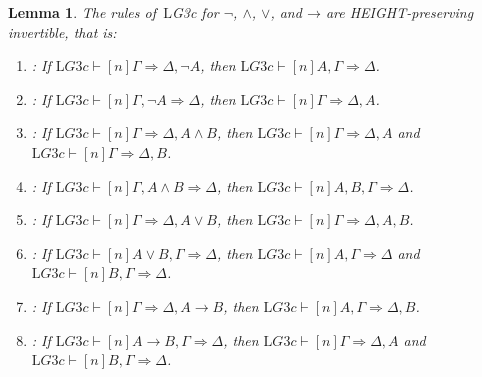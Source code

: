 \documentclass[10pt,a4paper]{article}
\newcommand*{\olup}[1]{\MakeUppercase{#1}}
\theoremstyle{plain}
\newtheorem{lem}[thm]{Lemma}
\theoremstyle{definition}
\theoremstyle{remark}
\newcommand*{\ollabel}[1]{\label{#1}}
\providecommand{\lif}{\mathbin{\rightarrow}}
\providecommand{\Sequent}{\mathrel{\Rightarrow}}
\providecommand{\Proves}{\mathrel{\vdash}}
\providecommand{\Log}{\ensuremath{\mathrm{L}}}
\providecommand{\LeftR}[1]{}
\providecommand{\RightR}[1]{}
\providecommand{\RightR}{\mathrm{R}}
\providecommand{\LeftR}{\mathrm{L}}
\begin{document}
\begin{lem}\ollabel{lem:G3c-invert}
The rules of~\Log{G3c} for $\lnot$, $\land$, $\lor$, and $\lif$ are
\olup{height}-preserving invertible, that is:
\begin{enumerate}
  \item \RightR{\lnot}: If $\Log{G3c} \Proves[n] \Gamma \Sequent
  \Delta, \lnot A$, then $\Log{G3c} \Proves[n] A, \Gamma \Sequent
  \Delta$.
  \item \LeftR{\lnot}: If $\Log{G3c} \Proves[n] \Gamma, \lnot A
  \Sequent \Delta$, then $\Log{G3c} \Proves[n] \Gamma \Sequent \Delta,
  A$.
  \item \RightR{\land}: If $\Log{G3c} \Proves[n] \Gamma \Sequent
  \Delta, A \land B$, then $\Log{G3c} \Proves[n] \Gamma \Sequent
  \Delta, A$ and $\Log{G3c} \Proves[n] \Gamma \Sequent
  \Delta, B$.
  \item \LeftR{\land}: If $\Log{G3c} \Proves[n] \Gamma, A \land B
  \Sequent \Delta$, then $\Log{G3c} \Proves[n] A, B, \Gamma \Sequent
  \Delta$.
  \item \RightR{\lor}: If $\Log{G3c} \Proves[n] \Gamma \Sequent
  \Delta, A \lor B$, then $\Log{G3c} \Proves[n] \Gamma \Sequent
  \Delta, A, B$.
  \item \LeftR{\lor}: If $\Log{G3c} \Proves[n] A \lor B, \Gamma \Sequent
  \Delta$, then $\Log{G3c} \Proves[n] A, \Gamma \Sequent
  \Delta$ and $\Log{G3c} \Proves[n] B, \Gamma \Sequent
  \Delta$.
  \item \RightR{\lif}: If $\Log{G3c} \Proves[n] \Gamma \Sequent
  \Delta, A \lif B$, then $\Log{G3c} \Proves[n] A, \Gamma \Sequent
  \Delta, B$.
  \item \LeftR{\lif}: If $\Log{G3c} \Proves[n] A \lif B, \Gamma
  \Sequent \Delta$, then $\Log{G3c} \Proves[n] \Gamma \Sequent \Delta,
  A$ and $\Log{G3c} \Proves[n] B, \Gamma \Sequent \Delta$.
\end{enumerate}
\end{lem}
\end{document}
